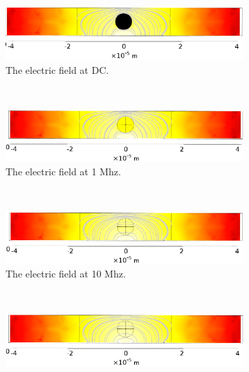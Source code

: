 \begin{figure}[h]
    \centering
    \begin{subfigure}[b]{\textwidth}
        \centering
        \includegraphics[width=\textwidth]{images/simple_cell_DC.png}
        \caption{The electric field at DC.}
    \end{subfigure}
    \\
    \vspace{0.1 in}
    \begin{subfigure}[b]{\textwidth}
        \centering
        \includegraphics[width=\textwidth]{images/simple_cell_1Mhz.png}
        \caption{The electric field at 1 Mhz.}
    \end{subfigure}
    \\
    \vspace{0.1 in}
    \begin{subfigure}[b]{\textwidth}
        \centering
        \includegraphics[width=\textwidth]{images/simple_cell_10Mhz.png}
        \caption{The electric field at 10 Mhz.}
    \end{subfigure}
        \\
    \vspace{0.1 in}
    \begin{subfigure}[b]{\textwidth}
        \centering
        \includegraphics[width=\textwidth]{images/simple_cell_1Ghz.png}

\end{subfigure}
\end{figure}

